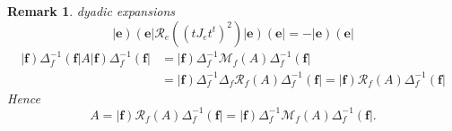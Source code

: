 \documentclass[aps,preprint]{revtex4}
\newtheorem{remark}[theorem]{Remark}
\begin{document}
\begin{remark}
dyadic expansions%
\begin{equation}
\left\vert \mathbf{e}\right) \left( \mathbf{e}\right\vert \mathcal{R}%
_{e}\left( \left( tJ_{e}t^{t}\right) ^{2}\right) \left\vert \mathbf{e}%
\right) \left( \mathbf{e}\right\vert =-\left\vert \mathbf{e}\right) \left( 
\mathbf{e}\right\vert
\end{equation}%
\begin{align}
\left\vert \mathbf{f}\right) \Delta _{f}^{-1}\left( \mathbf{f}\right\vert
A\left\vert \mathbf{f}\right) \Delta _{f}^{-1}\left( \mathbf{f}\right\vert &
=\left\vert \mathbf{f}\right) \Delta _{f}^{-1}\mathcal{M}_{f}\left( A\right)
\Delta _{f}^{-1}\left( \mathbf{f}\right\vert \\
& =\left\vert \mathbf{f}\right) \Delta _{f}^{-1}\Delta _{f}\mathcal{R}%
_{f}\left( A\right) \Delta _{f}^{-1}\left( \mathbf{f}\right\vert =\left\vert 
\mathbf{f}\right) \mathcal{R}_{f}\left( A\right) \Delta _{f}^{-1}\left( 
\mathbf{f}\right\vert
\end{align}%
Hence%
\begin{equation}
A=\left\vert \mathbf{f}\right) \mathcal{R}_{f}\left( A\right) \Delta
_{f}^{-1}\left( \mathbf{f}\right\vert =\left\vert \mathbf{f}\right) \Delta
_{f}^{-1}\mathcal{M}_{f}\left( A\right) \Delta _{f}^{-1}\left( \mathbf{f}%
\right\vert .
\end{equation}
\end{remark}
\end{document}
